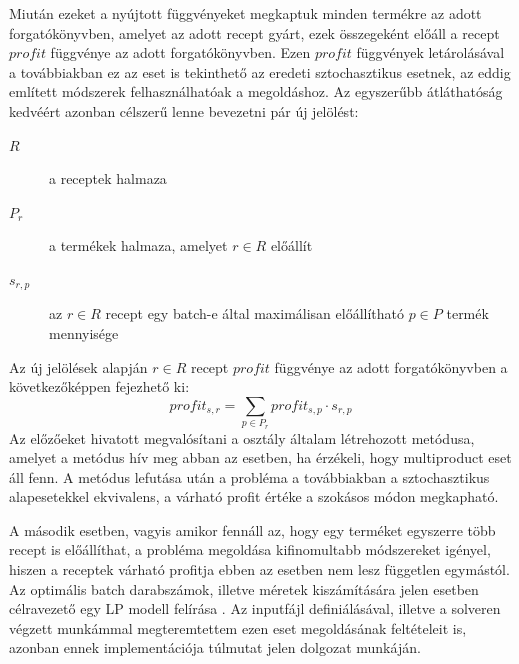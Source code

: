 Miután ezeket a nyújtott függvényeket megkaptuk minden termékre az adott forgatókönyvben, amelyet az adott recept gyárt, ezek összegeként előáll a recept $profit$ függvénye az adott forgatókönyvben.
Ezen $profit$ függvények letárolásával a továbbiakban ez az eset is tekinthető az eredeti sztochasztikus esetnek, az eddig említett módszerek felhasználhatóak a megoldáshoz.
Az egyszerűbb átláthatóság kedvéért azonban célszerű lenne bevezetni pár új jelölést:
\begin{description}
\item[$R$] a receptek halmaza
\item[$P_r$] a termékek halmaza, amelyet $r \in R$ előállít
\item[$s_{r,p}$] az $r \in R$ recept egy batch-e által maximálisan előállítható $p \in P$ termék mennyisége
\end{description}
Az új jelölések alapján $r \in R$ recept $profit$ függvénye az adott forgatókönyvben a következőképpen fejezhető ki:
$$profit_{s,r}=\sum_{p \in P_r} profit_{s,p} \cdot s_{r,p}$$ 
Az előzőeket hivatott megvalósítani a  osztály általam létrehozott  metódusa, amelyet a  metódus hív meg abban az esetben, ha érzékeli, hogy multiproduct eset áll fenn.
A metódus lefutása után a probléma a továbbiakban a sztochasztikus alapesetekkel ekvivalens, a várható profit értéke a szokásos módon megkapható.

A második esetben, vagyis amikor fennáll az, hogy egy terméket egyszerre több recept is előállíthat, a probléma megoldása kifinomultabb módszereket igényel, hiszen a receptek várható profitja ebben az esetben nem lesz független egymástól.
Az optimális batch darabszámok, illetve méretek kiszámítására jelen esetben célravezető egy LP modell felírása \cite{phd_Hegyhati}.  Az inputfájl definiálásával, illetve a solveren végzett munkámmal megteremtettem ezen eset megoldásának feltételeit is, azonban ennek implementációja túlmutat jelen dolgozat munkáján.

